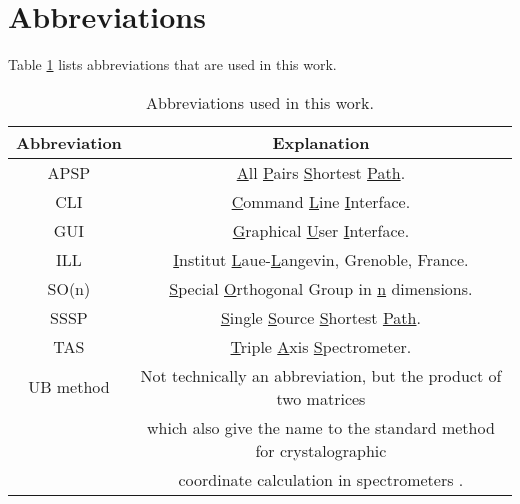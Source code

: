 \section{Abbreviations}
Table \ref{tab:abbreviations} lists abbreviations that are used in this work.

\begin{table}[htb]
	\centering
	\begin{tabular}{|c|c|}
		\hline
		\bf{Abbreviation} & \bf{Explanation} \tabularnewline
		\hline
		APSP		 & \underline{A}ll \underline{P}airs \underline{S}hortest \underline{Path}. \tabularnewline
		\hline
		CLI              & \underline{C}ommand \underline{L}ine \underline{I}nterface. \tabularnewline
		\hline
		GUI              & \underline{G}raphical \underline{U}ser \underline{I}nterface. \tabularnewline
		\hline
		ILL              & \underline{I}nstitut \underline{L}aue-\underline{L}angevin, Grenoble, France. \tabularnewline
		\hline
		SO(n)            & \underline{S}pecial \underline{O}rthogonal Group in \underline{n} dimensions. \tabularnewline
		\hline
		SSSP		 & \underline{S}ingle \underline{S}ource \underline{S}hortest \underline{Path}. \tabularnewline
		\hline
		TAS              & \underline{T}riple \underline{A}xis \underline{S}pectrometer. \tabularnewline
		\hline
		UB method        & Not technically an abbreviation, but the product of two matrices \tabularnewline
		                          & which also give the name to the standard method for crystalographic \tabularnewline
		                          & coordinate calculation in spectrometers \cite{Lumsden2005}. \tabularnewline
		\hline
	\end{tabular}
	\caption[Abbreviations]{Abbreviations used in this work.}
	\label{tab:abbreviations}
\end{table}
